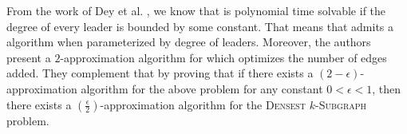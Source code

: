From the work of Dey et al. \cite{Dey2019}, we know that \HLdeg is polynomial time solvable
if the degree of every leader is bounded by some constant.
That means that \HLdeg admits a \FPT algorithm when parameterized by degree of leaders.
Moreover, the authors present a $2$-approximation algorithm for \HLdeg which optimizes
the number of edges added.
They complement that by proving that if there exists a $(2-\epsilon)$-approximation algorithm
for the above problem for any constant $0 < \epsilon < 1$, then there exists
a $(\frac{\epsilon}{2})$-approximation algorithm for the \textsc{Densest} $k$-\textsc{Subgraph} problem.
